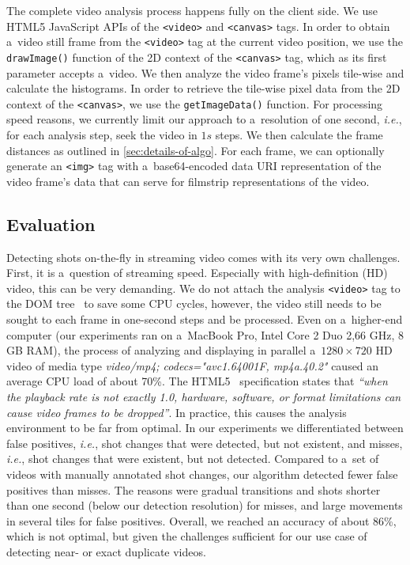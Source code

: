 The complete video analysis process happens fully
on the client side.
We use HTML5 JavaScript APIs of the \texttt{<video>} and
\texttt{<canvas>} tags.
In order to obtain a~video still frame
from the \texttt{<video>} tag at the current video position,
we use the \texttt{drawImage()} function of the 2D context of the
\texttt{<canvas>} tag,
which as its first parameter accepts a~video.
We then analyze the video frame's pixels tile-wise
and calculate the histograms.
In order to retrieve the tile-wise pixel data
from the 2D context of the \texttt{<canvas>},
we use the \texttt{getImageData()} function.
For processing speed reasons, we currently limit our approach to
a~resolution of one second, \emph{i.e.},
for each analysis step,
seek the video in $\mathit{1s}$ steps.
We then calculate the frame distances as outlined in
\autoref{sec:details-of-algo}.
For each frame, we can optionally generate an \texttt{<img>} tag
with a~base64-encoded data URI representation
of the video frame's data
that can serve for filmstrip representations of the video.

\subsection{Evaluation} \label{sec:evaluation}

Detecting shots on-the-fly in streaming video
comes with its very own challenges.
First, it is a~question of streaming speed.
Especially with high-definition (HD) video,
this can be very demanding.
We do not attach the analysis \texttt{<video>} tag
to the DOM tree~\cite{lehors2004dom} to save some CPU cycles,
however, the video still needs to be sought to each frame
in one-second steps and be processed.
Even on a~higher-end computer (our experiments ran on a~MacBook
Pro, Intel Core 2 Duo 2,66 GHz, 8 GB RAM),
the process of analyzing and displaying in parallel
a~$\mathit{1280} \times \mathit{720}$ HD video of media type
\emph{video/mp4; codecs="avc1.64001F, mp4a.40.2"}
caused an average CPU load of about 70\%.
The HTML5~\cite{berjon2012html5} specification states that
\textit{``when the playback rate is not exactly 1.0,
hardware, software, or format limitations can cause video frames
to be dropped''}.
In practice, this causes the analysis environment
to be far from optimal.
In our experiments we differentiated between false positives,
\emph{i.e.}, shot changes that were detected,
but not existent, and misses, \emph{i.e.},
shot changes that were existent,
but not detected.
Compared to a~set of videos with manually annotated shot changes,
our algorithm detected fewer false positives than misses.
The reasons were gradual transitions and shots
shorter than one second (below our detection resolution)
for misses, and large movements in several tiles
for false positives.
Overall, we reached an accuracy of about 86\%,
which is not optimal, but given the challenges
sufficient for our use case of
detecting near- or exact duplicate videos. 

